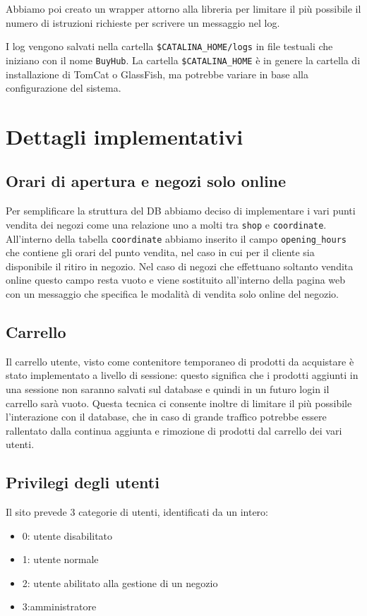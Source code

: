 Abbiamo poi creato un wrapper attorno alla libreria per limitare il più possibile il numero di istruzioni richieste per scrivere un messaggio nel log.

I log vengono salvati nella cartella \texttt{\$CATALINA\_HOME/logs} in file testuali che iniziano con il nome \texttt{BuyHub}.
La cartella \texttt{\$CATALINA\_HOME} è in genere la cartella di installazione di TomCat o GlassFish, ma potrebbe variare in base alla configurazione del sistema.

\chapter{Dettagli implementativi}

\section{Orari di apertura e negozi solo online}
Per semplificare la struttura del DB abbiamo deciso di implementare i vari punti vendita dei negozi come una relazione uno a molti tra \texttt{shop} e \texttt{coordinate}. All'interno della tabella \texttt{coordinate} abbiamo inserito il campo \texttt{opening\_hours} che contiene gli orari del punto vendita, nel caso in cui per il cliente sia disponibile il ritiro in negozio. Nel caso di negozi che effettuano soltanto vendita online questo campo resta vuoto e viene sostituito all'interno della pagina web con un messaggio che specifica le modalità di vendita solo online del negozio.

\section{Carrello}
Il carrello utente, visto come contenitore temporaneo di prodotti da acquistare è stato implementato a livello di sessione: questo significa che i prodotti aggiunti in una sessione non saranno salvati sul database e quindi in un futuro login il carrello sarà vuoto. Questa tecnica ci consente inoltre di limitare il più possibile l'interazione con il database, che in caso di grande traffico potrebbe essere rallentato dalla continua aggiunta e rimozione di prodotti dal carrello dei vari utenti.

\section{Privilegi degli utenti}
Il sito prevede 3 categorie di utenti, identificati da un intero:
\begin{itemize}
\item 0: utente disabilitato
\item 1: utente normale
\item 2: utente abilitato alla gestione di un negozio
\item 3:amministratore
\end{itemize}

